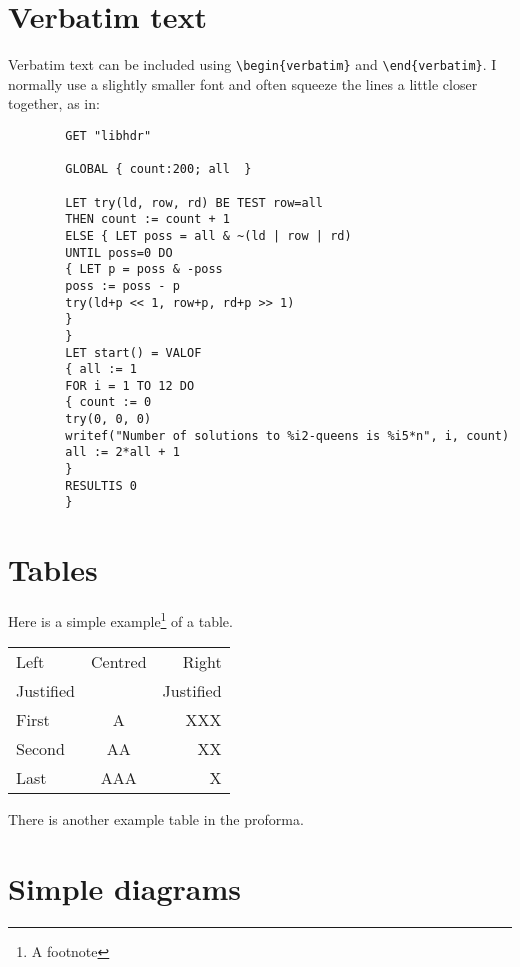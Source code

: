 \documentclass[a4paper,12pt,twoside,openright]{report}
\renewcommand{\baselinestretch}{1.1}    %
\begin{document}
	\section{Verbatim text}
	
	Verbatim text can be included using \verb|\begin{verbatim}| and
	\verb|\end{verbatim}|. I normally use a slightly smaller font and
	often squeeze the lines a little closer together, as in:
	
	{\renewcommand{\baselinestretch}{0.8}\small
		\begin{verbatim}
		GET "libhdr"
		
		GLOBAL { count:200; all  }
		
		LET try(ld, row, rd) BE TEST row=all
		THEN count := count + 1
		ELSE { LET poss = all & ~(ld | row | rd)
		UNTIL poss=0 DO
		{ LET p = poss & -poss
		poss := poss - p
		try(ld+p << 1, row+p, rd+p >> 1)
		}
		}
		LET start() = VALOF
		{ all := 1
		FOR i = 1 TO 12 DO
		{ count := 0
		try(0, 0, 0)
		writef("Number of solutions to %i2-queens is %i5*n", i, count)
		all := 2*all + 1
		}
		RESULTIS 0
		}
		\end{verbatim}
	}
	
	\section{Tables}
	
	\begin{samepage}
		Here is a simple example\footnote{A footnote} of a table.
		
		\begin{center}
			\begin{tabular}{l|c|r}
				Left      & Centred & Right \\
				Justified &         & Justified \\[3mm]
				First     & A       & XXX \\
				Second    & AA      & XX  \\
				Last      & AAA     & X   \\
			\end{tabular}
		\end{center}
		
		\noindent
		There is another example table in the proforma.
	\end{samepage}
	
	\section{Simple diagrams}
	
\end{document}
